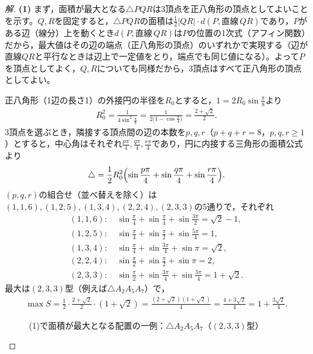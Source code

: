 \documentclass[../main.tex]{subfiles}
\begin{document}
\begin{proof}[解]
  \textbf{(1)} まず，面積が最大となる$\triangle PQR$は3頂点を正八角形の頂点としてよいことを示す。$Q,R$を固定すると，$\triangle PQR$の面積は$\frac12|QR|\cdot d(P,\text{直線}\,QR)$であり，$P$がある辺（線分）上を動くとき$d(P,\text{直線}\,QR)$は$P$の位置の1次式（アフィン関数）だから，最大値はその辺の端点（正八角形の頂点）のいずれかで実現する（辺が直線$QR$と平行なときは辺上で一定値をとり，端点でも同じ値になる）。よって$P$を頂点としてよく，$Q,R$についても同様だから，3頂点はすべて正八角形の頂点としてよい。

  正八角形（1辺の長さ1）の外接円の半径を$R_0$とすると，$1=2R_0\sin\frac\pi8$より
  \begin{align*}
    R_0^2=\frac1{4\sin^2\frac\pi8}=\frac1{2\bigl(1-\cos\frac\pi4\bigr)}=\frac{2+\sqrt2}2.
  \end{align*}
  3頂点を選ぶとき，隣接する頂点間の辺の本数を$p,q,r$（$p+q+r=8$，$p,q,r\ge1$）とすると，中心角はそれぞれ$\frac{p\pi}4,\frac{q\pi}4,\frac{r\pi}4$であり，円に内接する三角形の面積公式より
  \begin{align*}
    \triangle=\frac12R_0^2\Bigl(\sin\frac{p\pi}4+\sin\frac{q\pi}4+\sin\frac{r\pi}4\Bigr).
  \end{align*}
  $(p,q,r)$の組合せ（並べ替えを除く）は$(1,1,6),(1,2,5),(1,3,4),(2,2,4),(2,3,3)$の5通りで，それぞれ
  \begin{align*}
    (1,1,6):&\ \sin\frac\pi4+\sin\frac\pi4+\sin\frac{3\pi}2=\sqrt2-1,\\
    (1,2,5):&\ \sin\frac\pi4+\sin\frac\pi2+\sin\frac{5\pi}4=1,\\
    (1,3,4):&\ \sin\frac\pi4+\sin\frac{3\pi}4+\sin\pi=\sqrt2,\\
    (2,2,4):&\ \sin\frac\pi2+\sin\frac\pi2+\sin\pi=2,\\
    (2,3,3):&\ \sin\frac\pi2+\sin\frac{3\pi}4+\sin\frac{3\pi}4=1+\sqrt2.
  \end{align*}
  最大は$(2,3,3)$型（例えば$\triangle A_2A_5A_7$）で，
  \begin{align*}
    \max S=\frac12\cdot\frac{2+\sqrt2}2\cdot(1+\sqrt2)=\frac{(2+\sqrt2)(1+\sqrt2)}4=\frac{4+3\sqrt2}4=1+\frac{3\sqrt2}4.
  \end{align*}

  \begin{figure}[htb]
    \centering
    \caption{(1)で面積が最大となる配置の一例：$\triangle A_2A_5A_7$（$(2,3,3)$型）}
  \end{figure}


\end{proof}
\end{document}
